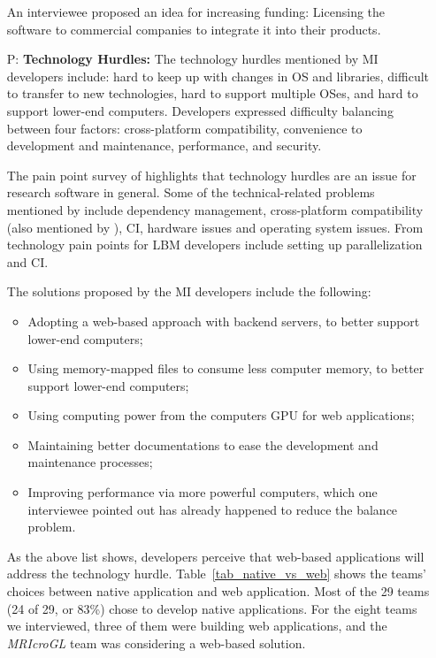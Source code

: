 \documentclass[final, 3p, times, authoryear]{elsarticle}
\newcounter{pnum} %
\begin{document}
\begin{enumerate}
An interviewee proposed an idea for increasing funding: Licensing the software
to commercial companies to integrate it into their products.
    
\item[P\refstepcounter{pnum}\thepnum \label{P_TechnologyHurdles}:]
\textbf{Technology Hurdles:} The technology hurdles mentioned by MI developers
include: hard to keep up with changes in OS and libraries, difficult to transfer
to new technologies, hard to support multiple OSes, and hard to support lower-end
computers. Developers expressed difficulty balancing between four factors:
cross-platform compatibility, convenience to development and maintenance,
performance, and security.

The pain point survey of \citet{WieseEtAl2019} highlights that technology
hurdles are an issue for research software in general.  Some of the
technical-related problems mentioned by \citet{WieseEtAl2019} include dependency
management, cross-platform compatibility (also mentioned by
\citet{PintoEtAl2018}), CI, hardware issues and operating system issues. From
\citep{SmithEtAl2022} technology pain points for LBM developers include setting
up parallelization and CI. 

The solutions proposed by the MI developers include the following:

\begin{itemize}
\item Adopting a web-based approach with backend servers, to better support
lower-end computers;
\item Using memory-mapped files to consume less computer memory, to better
support lower-end computers; 
\item Using computing power from the computers GPU for web applications;
\item Maintaining better documentations to ease the development and maintenance
processes;
\item Improving performance via more powerful computers, which one interviewee
pointed out has already happened to reduce the balance problem.
\end{itemize}

As the above list shows, developers perceive that web-based applications will
address the technology hurdle.  Table~\ref{tab_native_vs_web} shows the teams'
choices between native application and web application. Most of the 29 teams (24
of 29, or 83\%) chose to develop native applications. For the eight teams we
interviewed, three of them were building web applications, and the
\textit{MRIcroGL} team was considering a web-based solution.


\end{enumerate}
\end{document}

